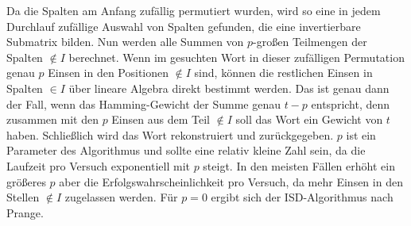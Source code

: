 \documentclass[a4paper,10pt,ngerman]{scrartcl}
\begin{document}
Da die Spalten am Anfang zufällig permutiert wurden, wird so eine in jedem Durchlauf zufällige Auswahl von Spalten gefunden, die eine invertierbare Submatrix bilden. 
Nun werden alle Summen von $p$-großen Teilmengen der Spalten $\notin I$ berechnet. 
Wenn im gesuchten Wort in dieser zufälligen Permutation genau $p$ Einsen in den Positionen $\notin I$ sind, können die restlichen Einsen in Spalten $\in I$ über lineare Algebra direkt bestimmt werden. 
Das ist genau dann der Fall, wenn das Hamming-Gewicht der Summe genau $t-p$ entspricht, denn zusammen mit den $p$ Einsen aus dem Teil $\notin I$ soll das Wort ein Gewicht von $t$ haben. 
Schließlich wird das Wort rekonstruiert und zurückgegeben. 
$p$ ist ein Parameter des Algorithmus und sollte eine relativ kleine Zahl sein, da die Laufzeit pro Versuch exponentiell mit $p$ steigt. In den meisten Fällen erhöht ein größeres $p$ aber die Erfolgswahrscheinlichkeit pro Versuch, da mehr Einsen in den Stellen $\notin I$ zugelassen werden. Für $p=0$ ergibt sich der ISD-Algorithmus nach Prange.
\end{document}
